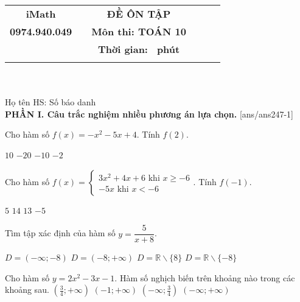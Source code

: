 \documentclass[12pt,a4paper]{article}
\newcommand{\tenso}{iMath}
\newcommand{\tentruong}{0974.940.049}
\newcommand{\tenkythi}{ĐỀ ÔN TẬP}
\newcommand{\tenmonthi}{Môn thi: TOÁN 10}
\newcommand{\thoigian}{}
\newcommand{\tieude}[1]{
   \begin{tabular}{cm{3cm}cm{3cm}cm{3cm}}
    {\bf \tenso} & & {\bf \tenkythi} \\
    {\bf \tentruong} & & {\bf \tenmonthi}\\
    && {\bf Thời gian: \bf \thoigian \, phút}\\
    && { \fbox{\bf Mã đề: #1}}
   \end{tabular}\\\\
    
   {Họ tên HS: \dotfill Số báo danh \dotfill}\\
}
\newcommand{\chantrang}[2]{\rfoot{Trang \thepage $-$ Mã đề #2}}
\begin{document}


\tieude{247}
\chantrang{\pageref{LastPage}}{247}
\setcounter{page}{1}
{\bf PHẦN I. Câu trắc nghiệm nhiều phương án lựa chọn.}
\setcounter{ex}{0}
[ans/ans247-1]
\begin{ex}
 Cho hàm số $f(x)=- x^{2} - 5 x + 4$. Tính $f(2)$.

 
\choice
{ $ {10}$ }
   { $ {-20 }$ }
     { \True ${ -10 }$ }
    { $ {-2}$ }
\end{ex}

\begin{ex}
 Cho hàm số $f(x)=\left\{ \begin{array}{l} 
     3 x^{2} + 4 x + 6 \text{ khi } x \ge -6  \\ 
     - 5 x \text{          khi  } x < -6  
     \end{array} \right.$. Tính $f(-1)$.

 
\choice
{ \True ${ 5 }$ }
   { $ {14 }$ }
     { $ {13}$ }
    { $ {-5}$ }
\end{ex}

\begin{ex}
 Tìm tập xác định của hàm số $y=\dfrac{5}{x + 8}$.
 
\choice
{ $D=\left( -\infty ; -8 \right)$ }
   { $D=\left( -8 ; +\infty \right)$ }
     { $D=\mathbb{R} \backslash \{ 8 \}$ }
    { \True $D=\mathbb{R} \backslash \{ -8 \}$ }
\end{ex}

\begin{ex}
 Cho hàm số $y=2 x^{2} - 3 x - 1 $. Hàm số nghịch biến trên khoảng nào trong các khoảng sau.
\choice
{ $\left(\frac{3}{4} ; +\infty\right)$ }
   { $\left(-1;+\infty\right)$ }
     { \True $\left(-\infty; \frac{3}{4}\right)$ }
    { $\left(-\infty; +\infty\right)$ }
\end{ex}
\end{document}
